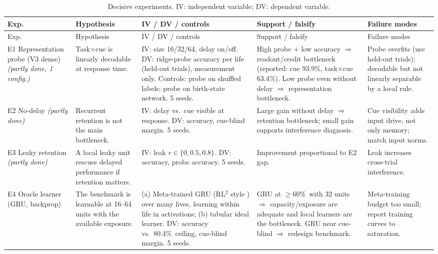 \documentclass[11pt]{article}
\theoremstyle{remark}
\newcommand{\pct}{\%}
\begin{document}
\begingroup\footnotesize
\setlength{\tabcolsep}{3pt}
\begin{longtable}{>{\raggedright\arraybackslash}p{1.6cm}>{\raggedright\arraybackslash}p{3.0cm}>{\raggedright\arraybackslash}p{3.1cm}>{\raggedright\arraybackslash}p{3.3cm}>{\raggedright\arraybackslash}p{3.8cm}}
\caption{Decisive experiments. IV: independent variable; DV: dependent variable.}\label{tab:program}\\
\toprule
Exp. & Hypothesis & IV / DV / controls & Support / falsify & Failure modes\\
\midrule\endfirsthead
\toprule Exp. & Hypothesis & IV / DV / controls & Support / falsify & Failure modes\\ \midrule\endhead
E1 Representation probe (V3 dense) \newline\emph{(partly done, 1 config.)} & Task$\times$cue is linearly decodable at response time. & IV: size 16/32/64, delay on/off. DV: ridge-probe accuracy per life (held-out trials), measurement only. Controls: probe on shuffled labels; probe on birth-state network. 5 seeds. & High probe + low accuracy $\Rightarrow$ readout/credit bottleneck (reported: cue 93.9\pct, task$\times$cue 63.4\pct). Low probe even without delay $\Rightarrow$ representation bottleneck. & Probe overfits (use held-out trials); decodable but not linearly separable by a local rule. \\
E2 No-delay \newline\emph{(partly done)} & Recurrent retention is not the main bottleneck. & IV: delay vs.\ cue visible at response. DV: accuracy, cue-blind margin. 5 seeds. & Large gain without delay $\Rightarrow$ retention bottleneck; small gain supports interference diagnosis. & Cue visibility adds input drive, not only memory; match input norms. \\
E3 Leaky retention \newline\emph{(partly done)} & A local leaky unit rescues delayed performance if retention matters. & IV: leak $r\in\{0,0.5,0.8\}$. DV: accuracy, probe accuracy. 5 seeds. & Improvement proportional to E2 gap. & Leak increases cross-trial interference. \\
E4 Oracle learner (GRU, backprop) & The benchmark is learnable at 16--64 units with the available exposure. & (a) Meta-trained GRU (RL$^2$ style \citep{duan2016rl2}) over many lives, learning within life in activations; (b) tabular ideal learner. DV: accuracy vs.\ 80.4\pct\ ceiling, cue-blind margin. 5 seeds. & GRU at $\ge$60\pct\ with 32 units $\Rightarrow$ capacity/exposure are adequate and local learners are the bottleneck. GRU near cue-blind $\Rightarrow$ redesign benchmark. & Meta-training budget too small; report training curves to saturation. \\

\end{longtable}
\end{document}
